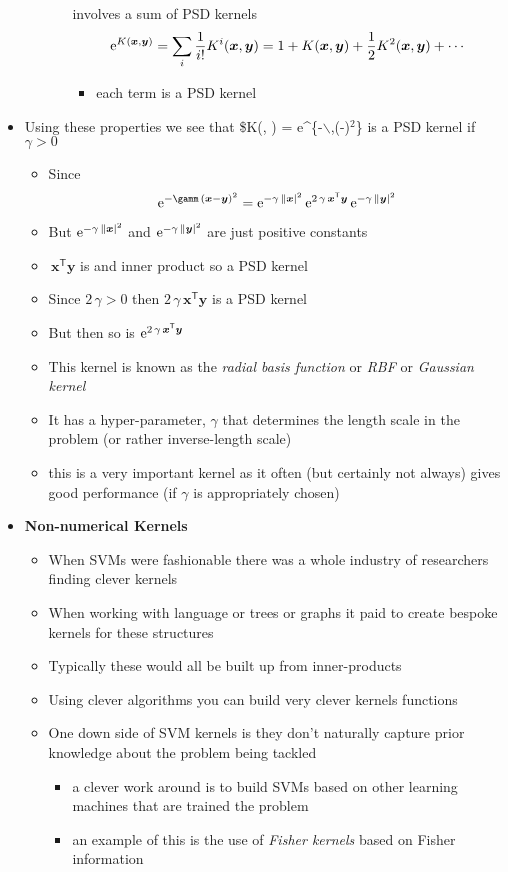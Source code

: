 \documentclass[11pt]{article}
\newcommand{\tr}{\textsf{T}}
\newcommand{\e}[1]{{\rm e}^{#1}}
\begin{document}
\begin{itemize}
\begin{enumerate}
\begin{itemize}
involves a sum of PSD kernels
$$\e{K(\bm{x}, \bm{y})} = \sum_i \frac{1}{i!} K^i(\bm{x}, \bm{y})
          = 1 + K(\bm{x}, \bm{y}) + \frac{1}{2} K^2(\bm{x}, \bm{y}) +
           \cdots $$
\begin{itemize}
\item each term is a PSD kernel
\end{itemize}
\end{itemize}
\end{enumerate}
\item Using these properties we see that \$K(, ) =
\e\{-\gamm$\backslash$,(-)\(^{\text{2}}\)\} is a PSD kernel if \(\gamma>0\)
\begin{itemize}
\item Since
$$ \e{-\gamm\,(\bm{x}-\bm{y})^2} =
       \e{-\gamma\,\|\bm{x}|^2}\,\e{2\,\gamma\,\bm{x}^\tr \bm{y}} \,
       \e{-\gamma\,\|\bm{y}|^2} $$
\item But \(\e{-\gamma\,\|\bm{x}|^2}\) and \(\e{-\gamma\,\|\bm{y}|^2}\)
are just positive constants
\item \(\,\bm{x}^\tr \bm{y}\) is and inner product so a PSD kernel
\item Since \(2\,\gamma>0\) then \(2\,\gamma\,\bm{x}^\tr \bm{y}\) is a
PSD kernel
\item But then so is \(\e{2\,\gamma\,\bm{x}^\tr \bm{y}}\)
\item This kernel is known as the \emph{radial basis function} or \emph{RBF} or
\emph{Gaussian kernel}
\item It has a hyper-parameter, \(\gamma\) that determines the length
scale in the problem (or rather inverse-length scale)
\item this is a very important kernel as it often (but certainly not
always) gives good performance (if \(\gamma\) is appropriately chosen)
\end{itemize}
\item \textbf{Non-numerical Kernels}
\begin{itemize}
\item When SVMs were fashionable there was a whole industry of
researchers finding clever kernels
\item When working with language or trees or graphs it paid to create
bespoke kernels for these structures
\item Typically these would all be built up from inner-products
\item Using clever algorithms you can build very clever kernels
functions
\item One down side of SVM kernels is they don't naturally capture
prior knowledge about the problem being tackled
\begin{itemize}
\item a clever work around is to build SVMs based on other learning
machines that are trained the problem
\item an example of this is the use of \emph{Fisher kernels} based on
Fisher information
\end{itemize}
\end{itemize}
\end{itemize}
\end{document}
